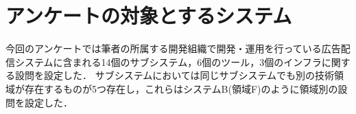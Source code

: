 \section{アンケートの対象とするシステム}
今回のアンケートでは筆者の所属する開発組織で開発・運用を行っている広告配信システムに含まれる14個のサブシステム，6個のツール，3個のインフラに関する設問を設定した．
サブシステムにおいては同じサブシステムでも別の技術領域が存在するものが5つ存在し，これらはシステムB(領域F)のように領域別の設問を設定した．
